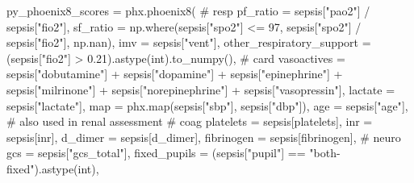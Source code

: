 \documentclass[
  letterpaper,
  DIV=11,
  numbers=noendperiod]{scrartcl}
\newenvironment{Shaded}{\begin{snugshade}}{\end{snugshade}}
\newcommand{\BuiltInTok}[1]{\textcolor[rgb]{0.00,0.23,0.31}{#1}}
\newcommand{\CommentTok}[1]{\textcolor[rgb]{0.37,0.37,0.37}{#1}}
\newcommand{\DecValTok}[1]{\textcolor[rgb]{0.68,0.00,0.00}{#1}}
\newcommand{\FloatTok}[1]{\textcolor[rgb]{0.68,0.00,0.00}{#1}}
\newcommand{\NormalTok}[1]{\textcolor[rgb]{0.00,0.23,0.31}{#1}}
\newcommand{\OperatorTok}[1]{\textcolor[rgb]{0.37,0.37,0.37}{#1}}
\newcommand{\StringTok}[1]{\textcolor[rgb]{0.13,0.47,0.30}{#1}}
\begin{document}
\begin{Shaded}
\begin{Highlighting}[]
\NormalTok{py\_phoenix8\_scores }\OperatorTok{=}\NormalTok{ phx.phoenix8(}
  \CommentTok{\# resp}
\NormalTok{    pf\_ratio }\OperatorTok{=}\NormalTok{ sepsis[}\StringTok{"pao2"}\NormalTok{] }\OperatorTok{/}\NormalTok{ sepsis[}\StringTok{"fio2"}\NormalTok{],}
\NormalTok{    sf\_ratio }\OperatorTok{=}\NormalTok{ np.where(sepsis[}\StringTok{"spo2"}\NormalTok{] }\OperatorTok{\textless{}=} \DecValTok{97}\NormalTok{, sepsis[}\StringTok{"spo2"}\NormalTok{] }\OperatorTok{/}\NormalTok{ sepsis[}\StringTok{"fio2"}\NormalTok{], np.nan),}
\NormalTok{    imv      }\OperatorTok{=}\NormalTok{ sepsis[}\StringTok{"vent"}\NormalTok{],}
\NormalTok{    other\_respiratory\_support }\OperatorTok{=}\NormalTok{ (sepsis[}\StringTok{"fio2"}\NormalTok{] }\OperatorTok{\textgreater{}} \FloatTok{0.21}\NormalTok{).astype(}\BuiltInTok{int}\NormalTok{).to\_numpy(),}
  \CommentTok{\# card}
\NormalTok{    vasoactives }\OperatorTok{=}\NormalTok{ sepsis[}\StringTok{"dobutamine"}\NormalTok{] }\OperatorTok{+}\NormalTok{ sepsis[}\StringTok{"dopamine"}\NormalTok{] }\OperatorTok{+}
\NormalTok{                  sepsis[}\StringTok{"epinephrine"}\NormalTok{] }\OperatorTok{+}\NormalTok{ sepsis[}\StringTok{"milrinone"}\NormalTok{] }\OperatorTok{+}
\NormalTok{                  sepsis[}\StringTok{"norepinephrine"}\NormalTok{] }\OperatorTok{+}\NormalTok{ sepsis[}\StringTok{"vasopressin"}\NormalTok{],}
\NormalTok{    lactate }\OperatorTok{=}\NormalTok{ sepsis[}\StringTok{"lactate"}\NormalTok{],}
    \BuiltInTok{map} \OperatorTok{=}\NormalTok{ phx.}\BuiltInTok{map}\NormalTok{(sepsis[}\StringTok{"sbp"}\NormalTok{], sepsis[}\StringTok{"dbp"}\NormalTok{]),}
\NormalTok{    age }\OperatorTok{=}\NormalTok{ sepsis[}\StringTok{"age"}\NormalTok{], }\CommentTok{\# also used in renal assessment}
  \CommentTok{\# coag}
\NormalTok{    platelets }\OperatorTok{=}\NormalTok{ sepsis[}\StringTok{\textquotesingle{}platelets\textquotesingle{}}\NormalTok{],}
\NormalTok{    inr }\OperatorTok{=}\NormalTok{ sepsis[}\StringTok{\textquotesingle{}inr\textquotesingle{}}\NormalTok{],}
\NormalTok{    d\_dimer }\OperatorTok{=}\NormalTok{ sepsis[}\StringTok{\textquotesingle{}d\_dimer\textquotesingle{}}\NormalTok{],}
\NormalTok{    fibrinogen }\OperatorTok{=}\NormalTok{ sepsis[}\StringTok{\textquotesingle{}fibrinogen\textquotesingle{}}\NormalTok{],}
  \CommentTok{\# neuro}
\NormalTok{    gcs }\OperatorTok{=}\NormalTok{ sepsis[}\StringTok{"gcs\_total"}\NormalTok{],}
\NormalTok{    fixed\_pupils }\OperatorTok{=}\NormalTok{ (sepsis[}\StringTok{"pupil"}\NormalTok{] }\OperatorTok{==} \StringTok{"both{-}fixed"}\NormalTok{).astype(}\BuiltInTok{int}\NormalTok{),}

\end{Highlighting}
\end{Shaded}
\end{document}
